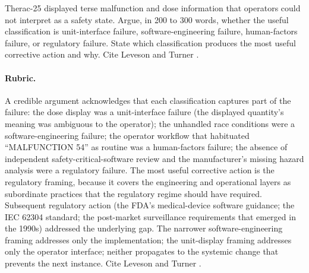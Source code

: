 \begin{exercise}
Therac-25 displayed terse malfunction and dose information that
operators could not interpret as a safety state. Argue, in 200 to 300
words, whether the useful classification is unit-interface failure,
software-engineering failure, human-factors failure, or regulatory
failure. State which classification produces the most useful
corrective action and why. Cite Leveson and Turner
\cite{paper:leveson-turner1993}.

\paragraph{Rubric.} A credible argument acknowledges that each
classification captures part of the failure: the dose display was a
unit-interface failure (the displayed quantity's meaning was
ambiguous to the operator); the unhandled race conditions were a
software-engineering failure; the operator workflow that habituated
``MALFUNCTION 54'' as routine was a human-factors failure; the
absence of independent safety-critical-software review and the
manufacturer's missing hazard analysis were a regulatory failure.
The most useful corrective action is the regulatory framing,
because it covers the engineering and operational layers as
subordinate practices that the regulatory regime should have
required. Subsequent regulatory action (the FDA's medical-device
software guidance; the IEC 62304 standard; the post-market
surveillance requirements that emerged in the 1990s) addressed the
underlying gap. The narrower software-engineering framing addresses
only the implementation; the unit-display framing addresses only
the operator interface; neither propagates to the systemic change
that prevents the next instance. Cite Leveson and Turner
\cite{paper:leveson-turner1993}.
\end{exercise}

